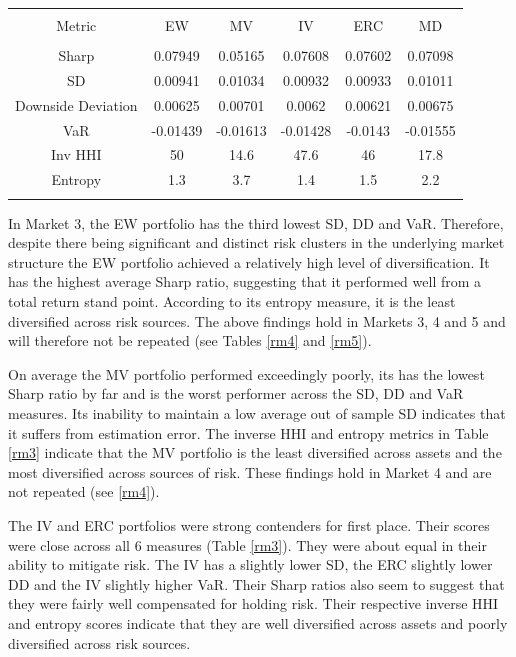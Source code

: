 \documentclass[11pt,preprint, authoryear]{elsarticle}
\let\origtable\table
\let\endorigtable\endtable
\renewenvironment{table}[1][2] {
    \expandafter\origtable\expandafter[H]
} {
    \endorigtable
}
\numberwithin{equation}{section}
\numberwithin{figure}{section}
\numberwithin{table}{section}
\begin{document}
\begin{table}[!htbp] \centering 
  \caption{Market 3 - Portfolio Risk Metrics} 
  \label{rm3} 
\begin{tabular}{@{\extracolsep{5pt}} cccccc} 
\\[-1.8ex]\hline 
\hline \\[-1.8ex] 
Metric & EW & MV & IV & ERC & MD \\ 
\hline \\[-1.8ex] 
Sharp & 0.07949 & 0.05165 & 0.07608 & 0.07602 & 0.07098 \\ 
SD & 0.00941 & 0.01034 & 0.00932 & 0.00933 & 0.01011 \\ 
Downside Deviation & 0.00625 & 0.00701 & 0.0062 & 0.00621 & 0.00675 \\ 
VaR & -0.01439 & -0.01613 & -0.01428 & -0.0143 & -0.01555 \\ 
Inv HHI & 50 & 14.6 & 47.6 & 46 & 17.8 \\ 
Entropy & 1.3 & 3.7 & 1.4 & 1.5 & 2.2 \\ 
\hline \\[-1.8ex] 
\end{tabular} 
\end{table}

In Market 3, the EW portfolio has the third lowest SD, DD and VaR.
Therefore, despite there being significant and distinct risk clusters in
the underlying market structure the EW portfolio achieved a relatively
high level of diversification. It has the highest average Sharp ratio,
suggesting that it performed well from a total return stand point.
According to its entropy measure, it is the least diversified across
risk sources. The above findings hold in Markets 3, 4 and 5 and will
therefore not be repeated (see Tables \ref{rm4} and \ref{rm5}).

On average the MV portfolio performed exceedingly poorly, its has the
lowest Sharp ratio by far and is the worst performer across the SD, DD
and VaR measures. Its inability to maintain a low average out of sample
SD indicates that it suffers from estimation error. The inverse HHI and
entropy metrics in Table \ref{rm3} indicate that the MV portfolio is the
least diversified across assets and the most diversified across sources
of risk. These findings hold in Market 4 and are not repeated (see
\ref{rm4}).

The IV and ERC portfolios were strong contenders for first place. Their
scores were close across all 6 measures (Table \ref{rm3}). They were
about equal in their ability to mitigate risk. The IV has a slightly
lower SD, the ERC slightly lower DD and the IV slightly higher VaR.
Their Sharp ratios also seem to suggest that they were fairly well
compensated for holding risk. Their respective inverse HHI and entropy
scores indicate that they are well diversified across assets and poorly
diversified across risk sources.
\end{document}
